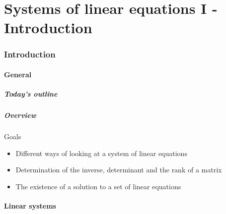\part{Systems of linear equations I - Introduction}
\section{Introduction}
\subsection*{General}
\begin{frame}[label=contentslin1]
  \frametitle{Today's outline}
\end{frame}

\begin{frame}
  \frametitle{Overview}
  \begin{block}{Goals}
    \begin{itemize}
      \item Different ways of looking at a system of linear equations
      \item Determination of the inverse, determinant and the rank of a matrix
      \item The existence of a solution to a set of linear equations
  \end{itemize}
  \end{block}
\end{frame}
% 
\subsection*{Linear systems}


